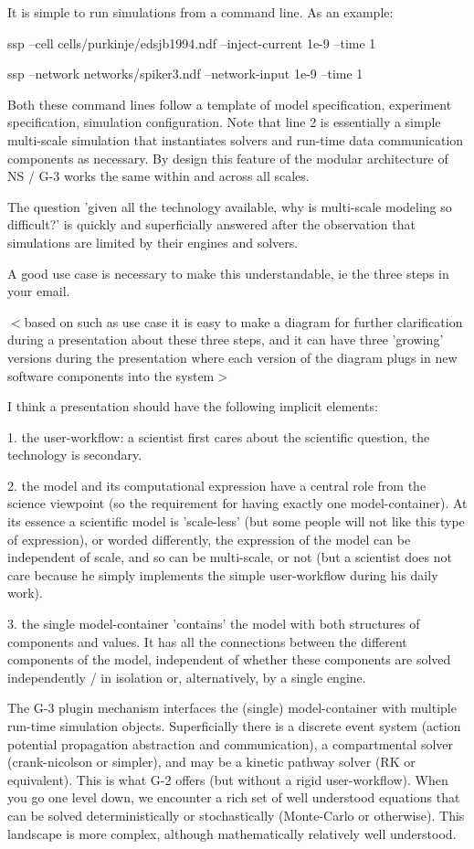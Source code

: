 \documentclass[12pt]{article}
\begin{document}
It is simple to run simulations from a command line.  As an example:

ssp --cell cells/purkinje/edsjb1994.ndf --inject-current 1e-9 --time 1

ssp --network networks/spiker3.ndf --network-input 1e-9 --time 1

Both these command lines follow a template of model specification,
experiment specification, simulation configuration.  Note that line 2
is essentially a simple multi-scale simulation that instantiates
solvers and run-time data communication components as necessary.  By
design this feature of the modular architecture of NS / G-3 works the
same within and across all scales.

The question 'given all the technology available, why is multi-scale
modeling so difficult?' is quickly and superficially answered after
the observation that simulations are limited by their engines and
solvers.

A good use case is necessary to make this understandable, ie the three
steps in your email.

$<$based on such as use case it is easy to make a diagram for further
clarification during a presentation about these three steps, and it
can have three 'growing' versions during the presentation where each
version of the diagram plugs in new software components into the
system$>$

I think a presentation should have the following implicit elements:

1. the user-workflow: a scientist first cares about the scientific
question, the technology is secondary.

2. the model and its computational expression have a central role from
the science viewpoint (so the requirement for having exactly one
model-container).  At its essence a scientific model is 'scale-less'
(but some people will not like this type of expression), or worded
differently, the expression of the model can be independent of scale,
and so can be multi-scale, or not (but a scientist does not care
because he simply implements the simple user-workflow during his daily
work).

3. the single model-container 'contains' the model with both
structures of components and values.  It has all the connections
between the different components of the model, independent of whether
these components are solved independently / in isolation or,
alternatively, by a single engine.

The G-3 plugin mechanism interfaces the (single) model-container with
multiple run-time simulation objects.  Superficially there is a
discrete event system (action potential propagation abstraction and
communication), a compartmental solver (crank-nicolson or simpler),
and may be a kinetic pathway solver (RK or equivalent).  This is what
G-2 offers (but without a rigid user-workflow).  When you go one level
down, we encounter a rich set of well understood equations that can be
solved deterministically or stochastically (Monte-Carlo or otherwise).
 This landscape is more complex, although mathematically relatively
well understood.
\end{document}
